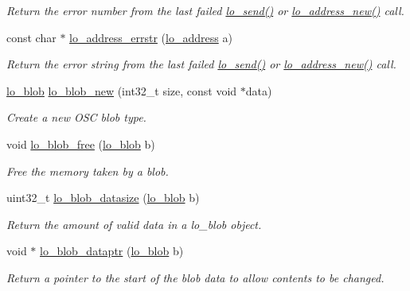 \begin{DoxyCompactItemize}
\begin{DoxyCompactList}\small\item\em Return the error number from the last failed \hyperlink{group__liblo_gafa4253874f97c2c16254ac57d2b7c987}{lo\+\_\+send()} or \hyperlink{group__liblo_gae5af61a02ab08871d3ea070c8f770cfe}{lo\+\_\+address\+\_\+new()} call. \end{DoxyCompactList}\item 
const char $\ast$ \hyperlink{group__liblo_gace321bfb9e529d8640e96e894db5400c}{lo\+\_\+address\+\_\+errstr} (\hyperlink{lo__types_8h_abf9b53223467de596b89e1377b0f3f3d}{lo\+\_\+address} a)
\begin{DoxyCompactList}\small\item\em Return the error string from the last failed \hyperlink{group__liblo_gafa4253874f97c2c16254ac57d2b7c987}{lo\+\_\+send()} or \hyperlink{group__liblo_gae5af61a02ab08871d3ea070c8f770cfe}{lo\+\_\+address\+\_\+new()} call. \end{DoxyCompactList}\item 
\hyperlink{lo__types_8h_a8e780f8c09e3e4dd737fe249f11d16fc}{lo\+\_\+blob} \hyperlink{group__liblo_gaffb2348c70cb0e1214fd50bdc7574c39}{lo\+\_\+blob\+\_\+new} (int32\+\_\+t size, const void $\ast$data)
\begin{DoxyCompactList}\small\item\em Create a new O\+S\+C blob type. \end{DoxyCompactList}\item 
void \hyperlink{group__liblo_gaa46ef058cfdf14a16936c062ebac19b9}{lo\+\_\+blob\+\_\+free} (\hyperlink{lo__types_8h_a8e780f8c09e3e4dd737fe249f11d16fc}{lo\+\_\+blob} b)
\begin{DoxyCompactList}\small\item\em Free the memory taken by a blob. \end{DoxyCompactList}\item 
uint32\+\_\+t \hyperlink{group__liblo_gab6c9184f0a54f19319d8a6409487b466}{lo\+\_\+blob\+\_\+datasize} (\hyperlink{lo__types_8h_a8e780f8c09e3e4dd737fe249f11d16fc}{lo\+\_\+blob} b)
\begin{DoxyCompactList}\small\item\em Return the amount of valid data in a lo\+\_\+blob object. \end{DoxyCompactList}\item 
void $\ast$ \hyperlink{group__liblo_ga064e3435301e0df338b75023a7ebf38e}{lo\+\_\+blob\+\_\+dataptr} (\hyperlink{lo__types_8h_a8e780f8c09e3e4dd737fe249f11d16fc}{lo\+\_\+blob} b)
\begin{DoxyCompactList}\small\item\em Return a pointer to the start of the blob data to allow contents to be changed. \end{DoxyCompactList}\item 

\end{DoxyCompactItemize}
